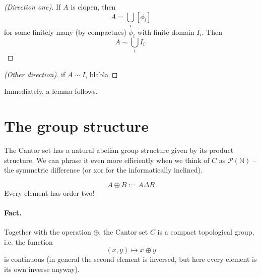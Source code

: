 
\begin{proof}[(Direction one)]
If \( A \) is clopen, then
\[ 
A = \bigcup_i \left[ \phi_i \right] 
\]
for some finitely many (by compactnes) \( \phi_i \) with finite domain \( I_i \). Then
\[ 
    A \sim \bigcup_i I_i. 
\]
\end{proof}

\begin{proof}[(Other direction)]
 if \( A \sim I \), blabla
\end{proof}

Immediately, a lemma follows.



\section{The group structure}

The Cantor set has a natural abelian group structure given by its product structure. We can phrase it even more efficiently when we think of \( C \) as \( \mathcal{P}( \mathbb{N} ) \) -- the symmetric difference (or xor for the informatically inclined).

\[ 
    A \oplus B := A \Delta B 
\]
Every element has order two!

\paragraph{Fact.} Together with the operation \( \oplus \), the Cantor set \( C \) is a compact topological group, i.e. the function
\[ 
    (x, y) \mapsto x \oplus y 
\]
is continuous (in general the second element is inversed, but here every element is its own inverse anyway). 

